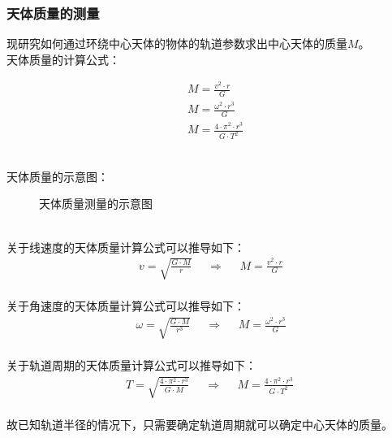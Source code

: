 \documentclass[UTF8]{ctexart}
\begin{document}
\newpage

\subsubsection{天体质量的测量}
    \setcounter{equation}{0}
    现研究如何通过环绕中心天体的物体的轨道参数求出中心天体的质量$M$。\\[3mm]
    天体质量的计算公式：
    \begin{large}
        \begin{align*}
            &M=\frac{v^2\cdot r}{G}\\[6mm]
            &M=\frac{\omega^2\cdot r^3}{G}\\[6mm]
            &M=\frac{4\cdot\pi^2\cdot r^3}{G\cdot T^2}
        \end{align*}
    \end{large}\\
    天体质量的示意图：
    \begin{figure}[h]
        \begin{center}
            \caption{天体质量测量的示意图}
        \end{center}
    \end{figure}\\
    关于线速度的天体质量计算公式可以推导如下：
    \begin{align}
        v=\sqrt{\frac{G\cdot M}{r}}~~~~~~\Longrightarrow~~~~~~M=\frac{v^2\cdot r}{G}
    \end{align}\\
    关于角速度的天体质量计算公式可以推导如下：
    \begin{align}
        \omega=\sqrt{\frac{G\cdot M}{r^3}}~~~~~~\Longrightarrow~~~~~~M=\frac{\omega^2\cdot r^3}{G}
    \end{align}\\
    关于轨道周期的天体质量计算公式可以推导如下：
    \begin{align}
        T=\sqrt{\frac{4\cdot \pi^2\cdot r^3}{G\cdot M}}~~~~~~\Longrightarrow~~~~~~M=\frac{4\cdot\pi^2\cdot r^3}{G\cdot T^2}~
    \end{align}\\
    故已知轨道半径的情况下，只需要确定轨道周期就可以确定中心天体的质量。
\end{document}
